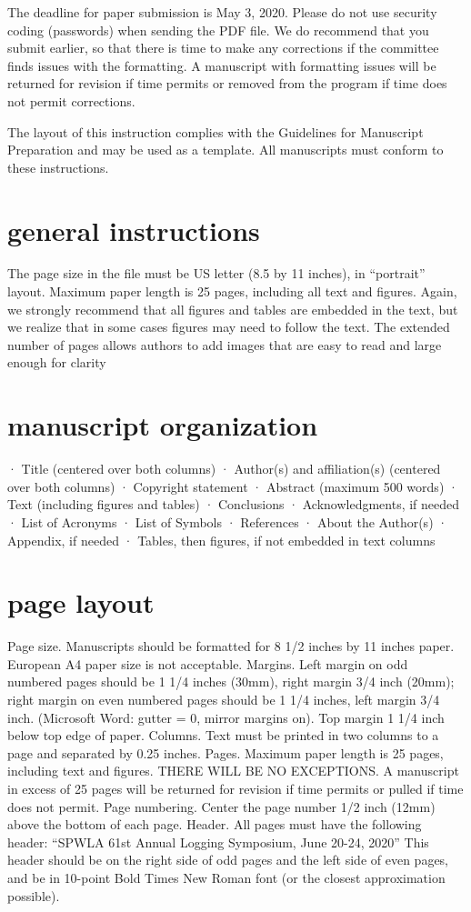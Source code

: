 \documentclass[10pt,twocolumn,twoside]{article}
\begin{document}
The deadline for paper submission is May 3, 2020. Please do not use security coding (passwords) when sending the PDF file. We do recommend that you submit earlier, so that there is time to make any corrections if the committee finds issues with the formatting. A manuscript with formatting issues will be returned for revision if time permits or removed from the program if time does not permit corrections.

The layout of this instruction complies with the Guidelines for Manuscript Preparation and may be used as a template. All manuscripts must conform to these instructions.

\section{general instructions}
The page size in the file must be US letter (8.5 by 11 inches), in “portrait” layout. Maximum paper length is 25 pages, including all text and figures. Again, we strongly recommend that all figures and tables are embedded in the text, but we realize that in some cases figures may need to follow the text. The extended number of pages allows authors to add images that are easy to read and large enough for clarity

\section{manuscript organization}
·	Title (centered over both columns)
·	Author(s) and affiliation(s) (centered over both columns)
·	Copyright statement
·	Abstract (maximum 500 words)
·	Text (including figures and tables)
·	Conclusions
·	Acknowledgments, if needed
·	List of Acronyms
·	List of Symbols
·	References
·	About the Author(s)
·	Appendix, if needed
·	Tables, then figures, if not embedded in text columns

\section{page layout}
Page size. Manuscripts should be formatted for 8 1/2 inches by 11 inches paper. European A4 paper size is not acceptable.
Margins. Left margin on odd numbered pages should be 1 1/4 inches (30mm), right margin 3/4 inch (20mm); right margin on even numbered pages should be 1 1/4 inches, left margin 3/4 inch. (Microsoft Word: gutter = 0, mirror margins on). Top margin 1 1/4 inch below top edge of paper.
Columns. Text must be printed in two columns to a page and separated by 0.25 inches. 
Pages. Maximum paper length is 25 pages, including text and figures. THERE WILL BE NO EXCEPTIONS. A manuscript in excess of 25 pages will be returned for revision if time permits or pulled if time does not permit.
Page numbering. Center the page number 1/2 inch (12mm) above the bottom of each page.
Header. All pages must have the following header: “SPWLA 61st Annual Logging Symposium, June 20-24, 2020” This header should be on the right side of odd pages and the left side of even pages, and be in 10-point Bold Times New Roman font (or the closest approximation possible).
\end{document}
